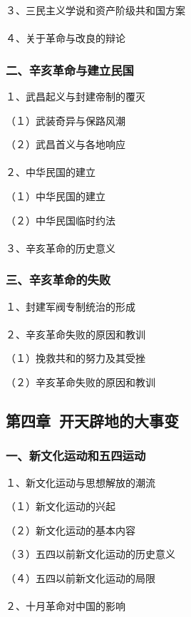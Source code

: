 \documentclass{ctexart}
\begin{document}
３、三民主义学说和资产阶级共和国方案
\\\\

４、关于革命与改良的辩论

\subsubsection{二、辛亥革命与建立民国}

１、武昌起义与封建帝制的覆灭

（１）武装奇异与保路风潮

（２）武昌首义与各地响应
\\\\

２、中华民国的建立

（１）中华民国的建立

（２）中华民国临时约法
\\\\

３、辛亥革命的历史意义

\subsubsection{三、辛亥革命的失败}

１、封建军阀专制统治的形成
\\\\

２、辛亥革命失败的原因和教训

（１）挽救共和的努力及其受挫

（２）辛亥革命失败的原因和教训


\subsection{第四章\ 开天辟地的大事变}

\subsubsection{一、新文化运动和五四运动}
１、新文化运动与思想解放的潮流

（１）新文化运动的兴起

（２）新文化运动的基本内容

（３）五四以前新文化运动的历史意义

（４）五四以前新文化运动的局限
\\\\

２、十月革命对中国的影响
\\\\
\end{document}
